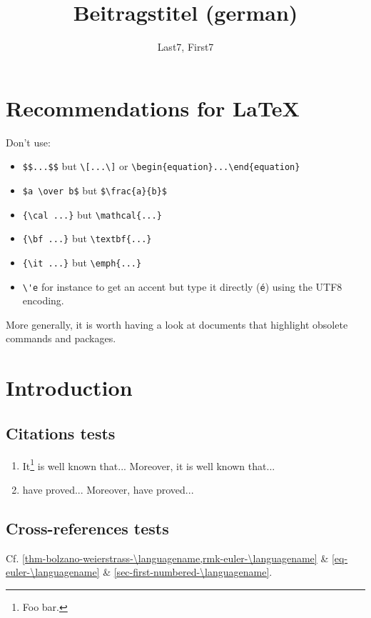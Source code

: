 \documentclass[ngerman]{nwejmart}
\begin{document}
\title{Beitragstitel (german)}
\author[affiliation={Affiliation 7},affiliation={Affiliation 7 bis}]{Last7, First7}
%
\begin{abstract}
  \lipsum[1]
\end{abstract}
%
%
%
%
\maketitle
%
\section*{Recommendations for \LaTeX}
Don't use:
\begin{itemize}
\item \verb+$$...$$+ but \verb+\[...\]+ or \verb+\begin{equation}...\end{equation}+
\item \verb+$a \over b$+ but \verb+$\frac{a}{b}$+
\item \verb+{\cal ...}+ but \verb+\mathcal{...}+
\item \verb+{\bf ...}+ but \verb+\textbf{...}+
\item \verb+{\it ...}+ but \verb+\emph{...}+
\item \verb+\'e+ for instance to get an accent but type it directly (\verb+é+)
  using the UTF8 encoding.
\end{itemize}
More generally, it is worth having a look at documents that highlight obsolete
commands and
packages\autocite{ensenbach2016,ensenbach2011,trettin2007,ensenbach2011a,trettin2007a}.
%
\section*{Introduction}
%
\subsection{Citations tests}
\begin{enumerate}
  \item It\footnote{Foo bar.} is well known\autocite{gerhardt}
    that... Moreover, it is well known\autocite{hammond} that...
  \item \textcite{gerhardt} have proved... Moreover, \textcite{hammond}
    have proved...
\end{enumerate}
%
\subsection{Cross-references tests}
Cf. \vref{thm-bolzano-weierstrass-\languagename,rmk-euler-\languagename} \&
\vref{eq-euler-\languagename} \& \vref{sec-first-numbered-\languagename}.
%
\end{document}
